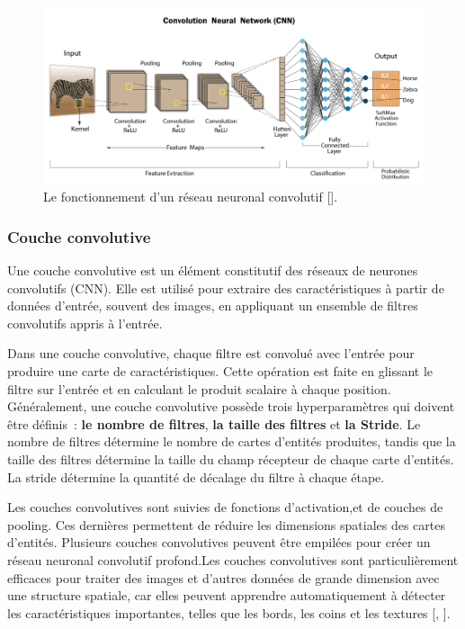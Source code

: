 \begin{figure}[hbt!]
	\centering
	\includegraphics[width=15
		cm]{images_pfe/cnn.png}
	\caption{Le fonctionnement d'un réseau neuronal convolutif [\cite{alharbi_hewahi_2021}].}
	\label{fig:cnn}
\end{figure}
\FloatBarrier
\medskip

\subsubsection{Couche convolutive }
Une couche convolutive est un élément constitutif des réseaux de neurones
convolutifs (CNN). Elle est utilisé pour extraire des caractéristiques à partir
de données d'entrée, souvent des images, en appliquant un ensemble de filtres
convolutifs appris à l'entrée.

\medskip
Dans une couche convolutive, chaque filtre est convolué avec l'entrée pour produire une carte de caractéristiques. Cette opération est faite en glissant le filtre sur l'entrée et en calculant le produit scalaire à chaque position. Généralement, une couche convolutive possède trois hyperparamètres qui doivent être définis : \textbf{le nombre de filtres}, \textbf{la taille des filtres} et \textbf{la Stride}. Le nombre de filtres détermine le nombre de cartes d'entités produites, tandis que la taille des filtres détermine la taille du champ récepteur de chaque carte d'entités. La stride détermine la quantité de décalage du filtre à chaque étape.

\medskip
Les couches convolutives sont suivies de fonctions d'activation,et de couches de pooling. Ces dernières permettent de réduire les dimensions spatiales des cartes d'entités. Plusieurs couches convolutives peuvent être empilées pour créer un réseau neuronal convolutif profond.Les couches convolutives sont particulièrement efficaces pour traiter des images et d'autres données de grande dimension avec une structure spatiale, car elles peuvent apprendre automatiquement à détecter les caractéristiques importantes, telles que les bords, les coins et les textures [\cite{kimura_yoshinaga_sekijima_azechi_baba_2019}, \cite{Goodfellow-et-al-2016}].


